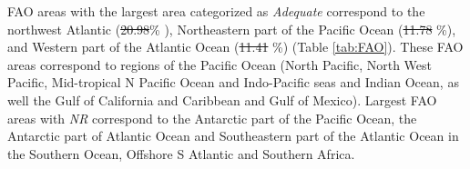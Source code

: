\documentclass[12pt,authoryear]{elsarticle}
\providecommand{\DIFaddtex}[1]{{\protect\color{blue}\uwave{#1}}} %
\providecommand{\DIFdeltex}[1]{{\protect\color{red}\sout{#1}}}                      %
\providecommand{\DIFaddbegin}{} %
\providecommand{\DIFaddend}{} %
\providecommand{\DIFdelbegin}{} %
\providecommand{\DIFdelend}{} %
\providecommand{\DIFadd}[1]{\texorpdfstring{\DIFaddtex{#1}}{#1}} %
\providecommand{\DIFdel}[1]{\texorpdfstring{\DIFdeltex{#1}}{}} %
\begin{document}
FAO areas with the largest area categorized as \textit{Adequate} correspond to the northwest Atlantic (\DIFdelbegin \DIFdel{20.98}\DIFdelend \DIFaddbegin \DIFadd{22.1}\DIFaddend \% ), Northeastern part of the Pacific Ocean (\DIFdelbegin \DIFdel{11.78 }\DIFdelend \DIFaddbegin \DIFadd{14.6 }\DIFaddend \%), and Western part of the Atlantic Ocean (\DIFdelbegin \DIFdel{11.41 }\DIFdelend \DIFaddbegin \DIFadd{12.6 }\DIFaddend \%) (Table \ref{tab:FAO}). These FAO areas correspond to regions of the Pacific Ocean (North Pacific, North West Pacific, Mid-tropical N Pacific Ocean and Indo-Pacific seas and Indian Ocean, as well the Gulf of California and Caribbean and Gulf of Mexico). Largest FAO areas with \textit{NR} correspond to the Antarctic part of the Pacific Ocean, the Antarctic part of Atlantic Ocean and Southeastern part of the Atlantic Ocean in the Southern Ocean, Offshore S Atlantic and Southern Africa. 

\DIFaddbegin 
\end{document}
